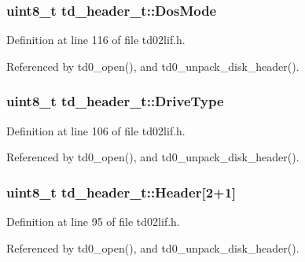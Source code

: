 \subsubsection[{\texorpdfstring{Dos\+Mode}{DosMode}}]{\setlength{\rightskip}{0pt plus 5cm}uint8\+\_\+t td\+\_\+header\+\_\+t\+::\+Dos\+Mode}\hypertarget{structtd__header__t_acb0710bd6f98290ea2490ce678b63894}{}\label{structtd__header__t_acb0710bd6f98290ea2490ce678b63894}


Definition at line 116 of file td02lif.\+h.



Referenced by td0\+\_\+open(), and td0\+\_\+unpack\+\_\+disk\+\_\+header().

\subsubsection[{\texorpdfstring{Drive\+Type}{DriveType}}]{\setlength{\rightskip}{0pt plus 5cm}uint8\+\_\+t td\+\_\+header\+\_\+t\+::\+Drive\+Type}\hypertarget{structtd__header__t_a865bd11809e67fd4ca8f1af0c46d9600}{}\label{structtd__header__t_a865bd11809e67fd4ca8f1af0c46d9600}


Definition at line 106 of file td02lif.\+h.



Referenced by td0\+\_\+open(), and td0\+\_\+unpack\+\_\+disk\+\_\+header().

\subsubsection[{\texorpdfstring{Header}{Header}}]{\setlength{\rightskip}{0pt plus 5cm}uint8\+\_\+t td\+\_\+header\+\_\+t\+::\+Header\mbox{[}2+1\mbox{]}}\hypertarget{structtd__header__t_a41510629d6bb7852f4e1e43443c38edd}{}\label{structtd__header__t_a41510629d6bb7852f4e1e43443c38edd}


Definition at line 95 of file td02lif.\+h.



Referenced by td0\+\_\+open(), and td0\+\_\+unpack\+\_\+disk\+\_\+header().

